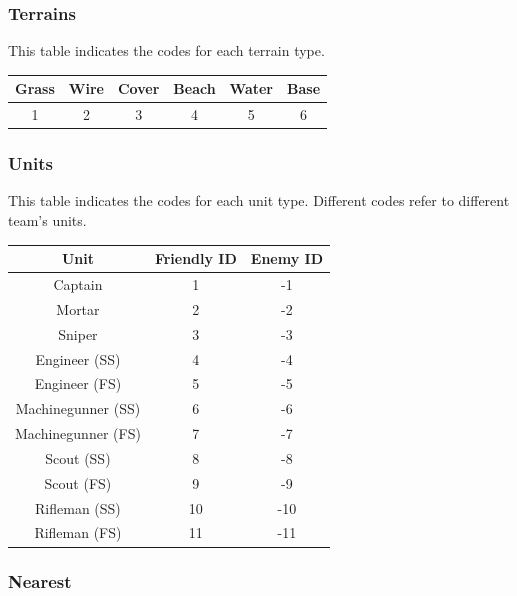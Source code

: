 \documentclass{article}
\begin{document}
\subsubsection{Terrains}

This table indicates the codes for each terrain type.

\begin{minipage}{\textwidth}
\centering
\begin{tabular}{c|c|c|c|c|c}
    Grass & Wire & Cover & Beach & Water & Base \\ \hline
    1 & 2 & 3 & 4 & 5 & 6
\end{tabular}
\end{minipage}

\subsubsection{Units}

This table indicates the codes for each unit type. Different codes refer to
different team's units.

\begin{minipage}{\textwidth}
\centering
\begin{tabular}{|c|c|c|}
    \hline Unit & Friendly ID & Enemy ID \\ \hline
    Captain & 1 & -1 \\ \hline
    Mortar & 2 & -2 \\ \hline
    Sniper & 3 & -3 \\ \hline
    Engineer (SS) & 4 & -4 \\ \hline
    Engineer (FS) & 5 & -5 \\ \hline
    Machinegunner (SS) & 6 & -6 \\ \hline
    Machinegunner (FS) & 7 & -7 \\ \hline
    Scout (SS) & 8 & -8 \\ \hline
    Scout (FS) & 9 & -9 \\ \hline
    Rifleman (SS) & 10 & -10 \\ \hline
    Rifleman (FS) & 11 & -11 \\ \hline
\end{tabular}
\end{minipage}

\subsubsection{Nearest}
\end{document}
